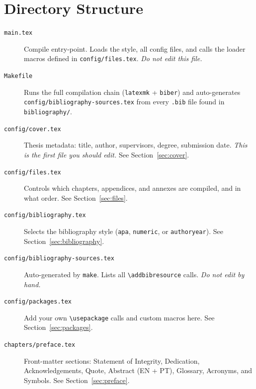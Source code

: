 \section{Directory Structure} \label{sec:structure}

\begin{description}
  \item[\texttt{main.tex}] Compile entry-point.  Loads the style, all
        config files, and calls the loader macros defined in
        \texttt{config/files.tex}.  \emph{Do not edit this file.}

  \item[\texttt{Makefile}] Runs the full compilation chain
        (\texttt{latexmk} + \texttt{biber}) and auto-generates
        \texttt{config/bibliography-sources.tex} from every \texttt{.bib}
        file found in \texttt{bibliography/}.

  \item[\texttt{config/cover.tex}] Thesis metadata: title, author, supervisors,
        degree, submission date.  \emph{This is the first file you should edit.}
        See Section~\ref{sec:cover}.

  \item[\texttt{config/files.tex}] Controls which chapters, appendices, and
        annexes are compiled, and in what order.
        See Section~\ref{sec:files}.

  \item[\texttt{config/bibliography.tex}] Selects the bibliography style
        (\texttt{apa}, \texttt{numeric}, or \texttt{authoryear}).
        See Section~\ref{sec:bibliography}.

  \item[\texttt{config/bibliography-sources.tex}] Auto-generated by
        \texttt{make}.  Lists all \texttt{\textbackslash addbibresource}
        calls.  \emph{Do not edit by hand.}

  \item[\texttt{config/packages.tex}] Add your own \texttt{\textbackslash usepackage}
        calls and custom macros here.
        See Section~\ref{sec:packages}.

  \item[\texttt{chapters/preface.tex}] Front-matter sections: Statement of
        Integrity, Dedication, Acknowledgements, Quote, Abstract (EN + PT),
        Glossary, Acronyms, and Symbols.
        See Section~\ref{sec:preface}.


\end{description}
